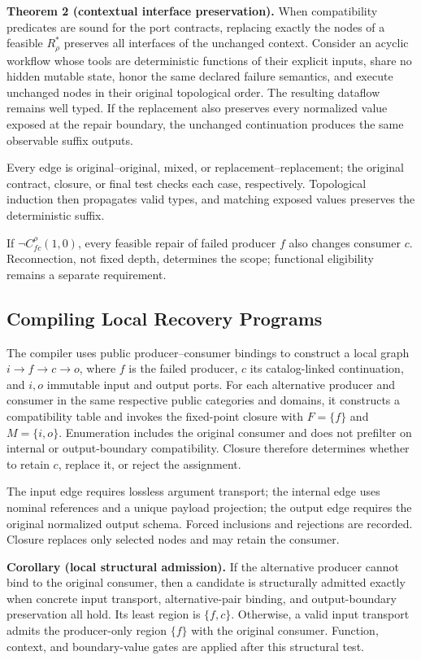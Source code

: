 \textbf{Theorem 2 (contextual interface preservation).}
When compatibility predicates are sound for the port contracts, replacing
exactly the nodes of a feasible $R^*_{\rho}$ preserves all interfaces of the unchanged
context. Consider an acyclic workflow whose tools are deterministic functions
of their explicit inputs, share no hidden mutable state, honor the same declared
failure semantics, and execute unchanged nodes in their original topological
order. The resulting dataflow remains well typed. If the replacement also
preserves every normalized value exposed at the repair boundary, the unchanged
continuation produces the same observable suffix outputs.

Every edge is original--original, mixed, or replacement--replacement;
the original contract, closure, or final test checks each case, respectively.
Topological induction then propagates valid types, and matching exposed
values preserves the deterministic suffix.

If $\neg C^{\rho}_{fc}(1,0)$, every feasible repair of failed producer $f$
also changes consumer $c$. Reconnection, not fixed depth, determines the scope;
functional eligibility remains a separate requirement.



\subsection{Compiling Local Recovery Programs}
The compiler uses public producer--consumer bindings to construct a local graph
$i\to f\to c\to o$, where $f$ is the failed producer, $c$ its catalog-linked
continuation, and $i,o$ immutable input
and output ports. For each alternative producer and consumer in the same
respective public categories and domains, it constructs a compatibility table
and invokes the fixed-point closure with $F=\{f\}$ and $M=\{i,o\}$. Enumeration includes
the original consumer and does not prefilter on internal or output-boundary
compatibility. Closure therefore determines whether to retain $c$, replace
it, or reject the assignment.

The input edge requires lossless argument transport; the internal edge uses
nominal references and a unique payload projection; the output edge requires
the original normalized output schema. Forced inclusions and rejections are
recorded. Closure replaces only selected nodes and may retain the consumer.

\textbf{Corollary (local structural admission).}
If the alternative producer cannot bind to the original consumer, then a
candidate is structurally admitted exactly when concrete input transport, alternative-pair
binding, and output-boundary preservation all hold. Its least region is
$\{f,c\}$. Otherwise, a valid input transport admits the producer-only region
$\{f\}$ with the original consumer. Function, context, and boundary-value gates are
applied after this structural test.

